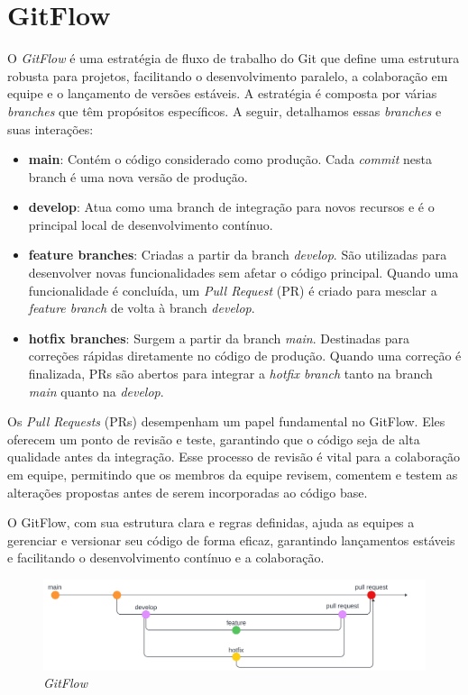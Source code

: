 \section{GitFlow}
O \textit{GitFlow} é uma estratégia de fluxo de trabalho do Git que define uma estrutura robusta para projetos, facilitando o desenvolvimento paralelo, a colaboração em equipe e o lançamento de versões estáveis. A estratégia é composta por várias \textit{branches} que têm propósitos específicos. A seguir, detalhamos essas \textit{branches} e suas interações:

\begin{itemize}
	\item \textbf{main}: Contém o código considerado como produção. Cada \textit{commit} nesta branch é uma nova versão de produção.
	      
	\item \textbf{develop}: Atua como uma branch de integração para novos recursos e é o principal local de desenvolvimento contínuo.
	      
	\item \textbf{feature branches}: Criadas a partir da branch \textit{develop}. São utilizadas para desenvolver novas funcionalidades sem afetar o código principal. Quando uma funcionalidade é concluída, um \textit{Pull Request} (PR) é criado para mesclar a \textit{feature branch} de volta à branch \textit{develop}.
	      
	\item \textbf{hotfix branches}: Surgem a partir da branch \textit{main}. Destinadas para correções rápidas diretamente no código de produção. Quando uma correção é finalizada, PRs são abertos para integrar a \textit{hotfix branch} tanto na branch \textit{main} quanto na \textit{develop}.
\end{itemize}

Os \textit{Pull Requests} (PRs) desempenham um papel fundamental no GitFlow. Eles oferecem um ponto de revisão e teste, garantindo que o código seja de alta qualidade antes da integração. Esse processo de revisão é vital para a colaboração em equipe, permitindo que os membros da equipe revisem, comentem e testem as alterações propostas antes de serem incorporadas ao código base.

O GitFlow, com sua estrutura clara e regras definidas, ajuda as equipes a gerenciar e versionar seu código de forma eficaz, garantindo lançamentos estáveis e facilitando o desenvolvimento contínuo e a colaboração.

\begin{figure}[ht]
	\centering
	\includegraphics[width=1\linewidth]{Textuais/gitflow.png}
	\caption{\textit{GitFlow}}
	\label{fig:enter-label}
\end{figure}

